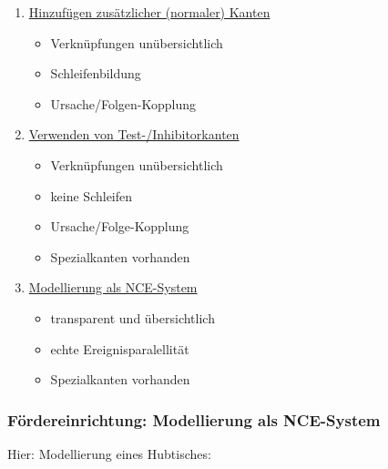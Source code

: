 \begin{enumerate}
	\item \underline{Hinzufügen zusätzlicher (normaler) Kanten} 
	
	\begin{itemize}
		\item Verknüpfungen unübersichtlich
		\item Schleifenbildung
		\item Ursache/Folgen-Kopplung
	\end{itemize}

	\item \underline{Verwenden von Test-/Inhibitorkanten}
	
	\begin{itemize}
		\item Verknüpfungen unübersichtlich
		\item keine Schleifen
		\item Ursache/Folge-Kopplung
		\item Spezialkanten vorhanden
	\end{itemize}
	
	\item \underline{Modellierung als NCE-System}
	
	\begin{itemize}
		\item transparent und übersichtlich
		\item echte Ereignisparalellität
		\item Spezialkanten vorhanden
	\end{itemize}
\end{enumerate}

\subsubsection{Fördereinrichtung: Modellierung als NCE-System}
Hier: Modellierung eines Hubtisches: 


